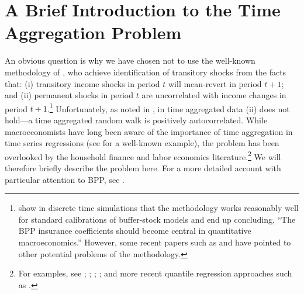 \documentclass[titlepage]{\econtex}\newcommand{\texname}{ConsumptionHeterogeneity}
\begin{document}
	\section{A Brief Introduction to the Time Aggregation Problem} \label{TimeAgg}
	An obvious question is why we have chosen not to use the well-known methodology of , who achieve identification of transitory shocks from the facts that: (i) transitory income shocks in period $t$ will mean-revert in period $t+1$; and (ii) permanent shocks in period $t$ are uncorrelated with income changes in period $t+1$.\footnote{ show in discrete time simulations that the methodology works reasonably well for standard calibrations of buffer-stock models and end up concluding, ``The BPP insurance coefficients should become central in quantitative macroeconomics.'' However, some recent papers such as  and  have pointed to other potential problems of the methodology.} Unfortunately, as noted in , in time aggregated data (ii) does not hold---a time aggregated random walk is positively autocorrelated. 
	While macroeconomists have long been aware of the importance of time aggregation in time series regressions (see  for a well-known example), the problem has been overlooked by the household finance and labor economics literature.\footnote{For examples, see ; ; ; ; and more recent quantile regression approaches such as .} We will therefore briefly describe the problem here. For a more detailed account with particular attention to BPP, see .
\end{document}
